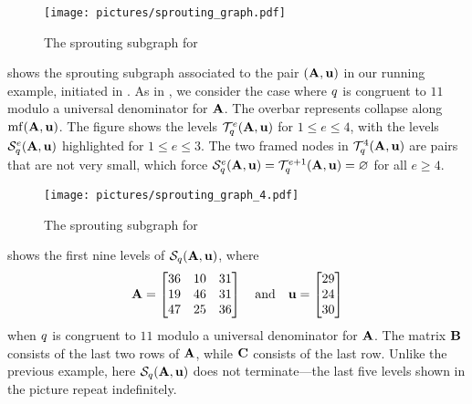 \documentclass{article}
\begin{document}
\newpage


\begin{example}
   \label{ex: ft.4}
   \begin{figure}
      \centering
      \texttt{[image: pictures/sprouting\_graph.pdf]}
      \caption{The sprouting subgraph for }
      \label{fig: sprouting graph}
   \end{figure}
    shows the sprouting subgraph associated to the pair $(\mathbf{A},\mathbf{u})$ in our running example, initiated in .
   As in , we consider the case where $q$ is congruent to $11$ modulo a universal denominator for $\mathbf{A}$.
   The overbar represents collapse along $\operatorname{mf}(\mathbf{A},\mathbf{u})$.
   The figure shows the levels $\mathcal{T}_{q}^e(\mathbf{A},\mathbf{u})$ for $1 \le e \le 4$, with the levels $\mathcal{S}_{q}^e(\mathbf{A},\mathbf{u})$ highlighted for $1 \leq e \leq 3$.
   The two framed nodes in $\mathcal{T}_{q}^4(\mathbf{A}, \mathbf{u})$ are pairs that are not very small, which force $\mathcal{S}_{q}^e(\mathbf{A},\mathbf{u}) = \mathcal{T}_{q}^{e+1}(\mathbf{A}, \mathbf{u}) = \varnothing$ for all $e \geq 4$.
\end{example}

\begin{example}
   \label{ex: new example}
   \begin{figure}
      \centering
      \texttt{[image: pictures/sprouting\_graph\_4.pdf]}
      \caption{The sprouting subgraph for }
      \label{fig: sprouting graph 2}
   \end{figure}
    shows the first nine levels of $\mathcal{S}_{q}(\mathbf{A},\mathbf{u})$, where
   \[
      \mathbf{A} = \begin{bmatrix} 36&10&31 \\ 19&46&31 \\ 47&25&36 \end{bmatrix}
      \quad\text{and} \quad
      \mathbf{u} =\begin{bmatrix} 29 \\ 24 \\ 30 \end{bmatrix}
   \]
   when $q$ is congruent to $11$ modulo a universal denominator for $\mathbf{A}$.
   The matrix $\mathbf{B}$ consists of the last two rows of $\mathbf{A}$, while $\mathbf{C}$ consists of the last row.
   Unlike the previous example, here $\mathcal{S}_{q}(\mathbf{A},\mathbf{u})$ does not terminate---the last five levels shown in the picture repeat indefinitely.
\end{example}
\end{document}
